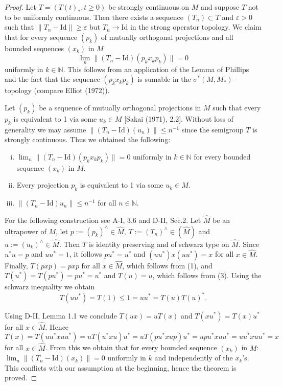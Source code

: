 \documentclass{article}
\theoremstyle{plain} %
\theoremstyle{definition} %
\begin{document}
\begin{proof}
Let $T=(T(t)_{*}, t \geq 0)$ be strongly continuous on $M$ and suppose $T$ not to be uniformly continuous.
Then there exists a sequence $(T_n) \subset T$ and $\varepsilon > 0$ such that $\|T_n-\text{Id}\| \geq \varepsilon$ but $T_n \to \text{Id}$ in the strong operator topology.
We claim that for every sequence $(p_k)$ of mutually orthogonal projections and all bounded sequences $(x_k)$ in $M$
\[
\lim_{n}\|(T_n-\text{Id})(p_k x_k p_k)\|=0
\]
uniformly in $k \in \mathbb{N}$.
This follows from an application of the Lemma of Phillips and the fact that the sequence $(p_k x_k p_k)$ is sumable in the $\sigma^*(M,M_*)$-topology (compare Elliot (1972)).

Let $(p_k)$ be a sequence of mutually orthogonal projections in $M$ such that every $p_k$ is equivalent to 1 via some $u_k \in M$ [Sakai (1971), 2.2].
Without loss of generality we may assume $\|(T_n-\text{Id})(u_n)\| \leq n^{-1}$ since the semigroup $T$ is strongly continuous.
Thus we obtained the following:
\begin{enumerate}[(i)]
\item $\lim_{n}\|(T_n-\text{Id})(p_k x_k p_k)\|=0$ uniformly in $k \in \mathbb{N}$ for every bounded sequence $(x_k)$ in $M$.
\item Every projection $p_k$ is equivalent to 1 via some $u_k \in M$.
\item $\|(T_n-\text{Id})u_n\| \leq n^{-1}$ for all $n \in \mathbb{N}$.
\end{enumerate}

For the following construction see A-I, 3.6 and D-II, Sec.2.
Let $\hat{M}$ be an ultrapower of $M$, let $p:=(p_k)^\wedge \in \hat{M}$, $T:=(T_n)^\wedge \in (\hat{M})$ and $u:=(u_k)^\wedge \in \hat{M}$.
Then $T$ is identity preserving and of schwarz type on $\hat{M}$.
Since $u^*u=p$ and $uu^*=1$, it follows $pu^*=u^*$ and $(uu^*)x(uu^*)=x$ for all $x \in \hat{M}$.
Finally, $T(pxp)=pxp$ for all $x \in \hat{M}$, which follows from (1), and $T(u^*)=T(pu^*)=pu^*=u^*$ and $T(u)=u$, which follows from (3).
Using the schwarz inequality we obtain
\[
T(uu^*)=T(1) \leq 1=uu^*=T(u)T(u)^*.
\]

Using D-II, Lemma 1.1 we conclude $T(ux)=uT(x)$ and $T(xu^*)=T(x)u^*$ for all $x \in \hat{M}$.
Hence
$T(x)=T(uu^*xuu^*)=uT(u^*xu)u^*=uT(pu^*xup)u^*=upu^*xuu^*=uu^*xuu^*=x$
for all $x \in \hat{M}$.
From this we obtain that for every bounded sequence $(x_k)$ in $M$:
$\lim_{n}\|(T_n-\text{Id})(x_k)\|=0$ uniformly in $k$ and independently of the $x_k$'s.
This conflicts with our assumption at the beginning, hence the theorem is proved.
\end{proof}
\end{document}
